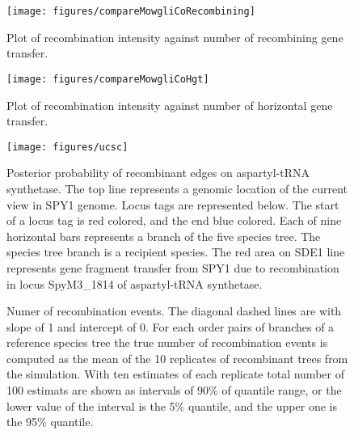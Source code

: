 \documentclass[english]{article}
\begin{document}
\begin{figure}
\begin{center}
\texttt{[image: figures/compareMowgliCoRecombining]}
\end{center}
\caption{\label{fig:cmpcomowgli}Plot of recombination intensity against number
of recombining gene transfer.}
\end{figure}
\clearpage{}

\begin{figure}
\begin{center}
\texttt{[image: figures/compareMowgliCoHgt]}
\end{center}
\caption{\label{fig:cmpcomowglihgt}Plot of recombination intensity against number
of horizontal gene transfer.}
\end{figure}
\clearpage{}

\begin{figure}
\texttt{[image: figures/ucsc]}
\caption{\label{fig:muts}Posterior probability of recombinant edges on 
aspartyl-tRNA
synthetase.  The
top line represents a genomic location of the current view in SPY1 genome. Locus
tags are represented below. The start of a locus tag is red colored, and the end
blue colored. Each of nine horizontal bars represents a branch of the five
species tree. The species tree branch is a recipient species.
The red area on SDE1 line represents gene fragment transfer from
SPY1 due to recombination in locus SpyM3\_1814 of aspartyl-tRNA synthetase.}
\end{figure}
\clearpage{}%

\begin{figure}
\caption{\label{fig:h1}Numer of recombination events. The diagonal dashed
lines are with slope of 1 and intercept of 0. For each order
pairs of branches of a reference species tree the true number of recombination
events is computed as the mean of the 10 replicates of recombinant
trees from the simulation. With ten estimates of each replicate total
number of 100 estimats are shown as intervals of 90\% of quantile
range, or the lower value of the interval is the 5\% quantile, and
the upper one is the 95\% quantile. }
\end{figure}
\clearpage{}%
\end{document}
